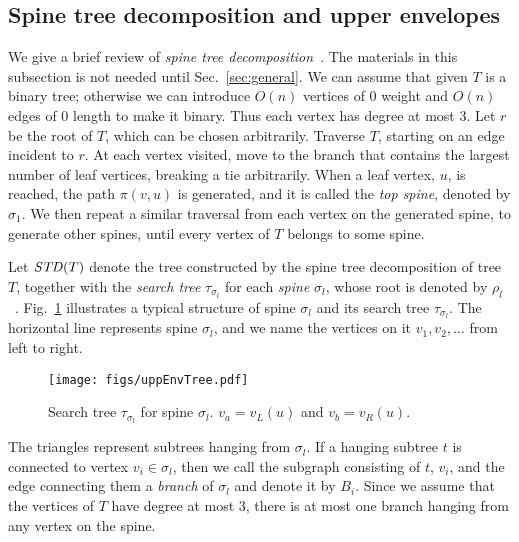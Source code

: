 \documentclass{llncs}
\begin{document}
{\subsection{Spine tree decomposition and upper envelopes}\label{sec:std}
We give a brief review of {\em spine tree decomposition}~\cite{benkoczi2004,benkoczi2003}.
The materials in this subsection is not needed until Sec.~\ref{sec:general}.
We can assume that given $T$ is a binary tree;
otherwise we can introduce $O(n)$ vertices of 0 weight and $O(n)$ edges of
0 length to make it binary.
Thus each vertex has degree at most 3.
Let $r$ be the root of $T$,
which can be chosen arbitrarily.
Traverse $T$, starting on an edge incident to $r$.
At each vertex visited,
move to the branch that contains the largest number of leaf vertices,
breaking a tie arbitrarily.
When a leaf vertex, $u$, is reached, the path $\pi(v,u)$ is generated,
and it is called the {\em top spine}, denoted by $\sigma_1$.
We then repeat a similar traversal from each vertex on the generated spine,
to generate other spines, until every vertex of $T$ belongs to some spine.

Let ${\it STD}(T)$ denote the tree constructed by the spine tree decomposition of tree $T$,
together with the {\em search tree} $\tau_{\sigma_l}$ for each {\em spine} $\sigma_l$,
whose root is denoted by $\rho_l$~\cite{benkoczi2004,benkoczi2003}.
Fig.~\ref{fig:uppEnvTree}  illustrates a typical structure of spine $\sigma_l$ and
its search tree $\tau_{\sigma_l}$.
The horizontal line represents spine $\sigma_l$,
and we name the vertices on it  $v_1, v_2, \ldots$ from left to right. 
\begin{figure}[ht]
\centering
\texttt{[image: figs/uppEnvTree.pdf]}
\caption{Search tree $\tau_{\sigma_l}$ for spine $\sigma_l$.
$v_a=v_L(u)$ and $v_b=v_R(u)$. 
}
\label{fig:uppEnvTree}
\end{figure}
The triangles represent subtrees hanging from $\sigma_l$.
If a hanging subtree $t$ is connected to vertex $v_i\in \sigma_l$,
then we call the subgraph consisting of $t$, $v_i$, and the edge connecting them a {\em branch}
of $\sigma_l$ and denote it by $B_i$.
Since we assume that the vertices of $T$ have degree at most 3,
there is at most one branch hanging from any vertex on the spine.
 
}
\end{document}
